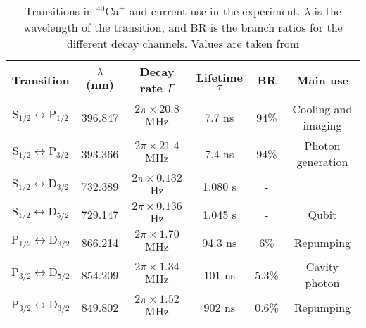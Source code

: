 \begin{table}[H]
\centering
\begin{tabular}{c c c c c c}
 \toprule
    {Transition} & { $\lambda$ (nm)} & {Decay rate $\Gamma$} & Lifetime $\tau$ & BR & {Main use} \\ \midrule
   $\text{S}_{1/2} \leftrightarrow \text{P}_{1/2}$ & 396.847 & $2\pi \times 20.8$ MHz & 7.7 ns & 94\% &Cooling and imaging \\
    $\text{S}_{1/2} \leftrightarrow \text{P}_{3/2}$  & 393.366 & $2\pi \times 21.4$ MHz & 7.4 ns & 94\% &Photon generation\\ \midrule
   $\text{S}_{1/2} \leftrightarrow \text{D}_{3/2}$ & 732.389 & $2\pi \times 0.132$ Hz & 1.080 s & - &\\
    $\text{S}_{1/2} \leftrightarrow \text{D}_{5/2}$  & 729.147 & $2\pi \times 0.136$ Hz & 1.045 s & - & Qubit  \\\midrule
    $\text{P}_{1/2} \leftrightarrow \text{D}_{3/2}$  & 866.214 &  $2\pi \times 1.70$ MHz  &  94.3 ns & 6\% & Repumping \\
    $\text{P}_{3/2} \leftrightarrow \text{D}_{5/2}$  & 854.209 & $2\pi \times 1.34$ MHz & 101 ns & 5.3\%  & Cavity photon  \\
    $\text{P}_{3/2} \leftrightarrow \text{D}_{3/2}$  & 849.802 & $2\pi \times 1.52$ MHz  & 902 ns & 0.6\%  & Repumping \\ \bottomrule
\end{tabular}
\caption{Transitions in $^{40}\text{Ca}^+$ and current use in the experiment. $\lambda$ is the wavelength of the transition, and BR is the branch ratios for the different decay channels. Values are taken from \cite{ion_spacing,stute}}
\label{transitiontable}
\end{table}

